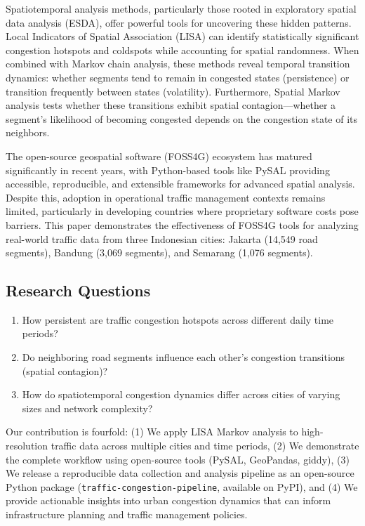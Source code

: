 \documentclass[11pt,a4paper]{article}
\begin{document}
Spatiotemporal analysis methods, particularly those rooted in exploratory spatial data analysis (ESDA), offer powerful tools for uncovering these hidden patterns. Local Indicators of Spatial Association (LISA) can identify statistically significant congestion hotspots and coldspots while accounting for spatial randomness. When combined with Markov chain analysis, these methods reveal temporal transition dynamics: whether segments tend to remain in congested states (persistence) or transition frequently between states (volatility). Furthermore, Spatial Markov analysis tests whether these transitions exhibit spatial contagion---whether a segment's likelihood of becoming congested depends on the congestion state of its neighbors.

The open-source geospatial software (FOSS4G) ecosystem has matured significantly in recent years, with Python-based tools like PySAL providing accessible, reproducible, and extensible frameworks for advanced spatial analysis. Despite this, adoption in operational traffic management contexts remains limited, particularly in developing countries where proprietary software costs pose barriers. This paper demonstrates the effectiveness of FOSS4G tools for analyzing real-world traffic data from three Indonesian cities: Jakarta (14,549 road segments), Bandung (3,069 segments), and Semarang (1,076 segments).

\subsection*{Research Questions}

\begin{enumerate}
    \item How persistent are traffic congestion hotspots across different daily time periods?
    \item Do neighboring road segments influence each other's congestion transitions (spatial contagion)?
    \item How do spatiotemporal congestion dynamics differ across cities of varying sizes and network complexity?
\end{enumerate}

Our contribution is fourfold: (1) We apply LISA Markov analysis to high-resolution traffic data across multiple cities and time periods, (2) We demonstrate the complete workflow using open-source tools (PySAL, GeoPandas, giddy), (3) We release a reproducible data collection and analysis pipeline as an open-source Python package (\texttt{traffic-congestion-pipeline}, available on PyPI), and (4) We provide actionable insights into urban congestion dynamics that can inform infrastructure planning and traffic management policies.
\end{document}
